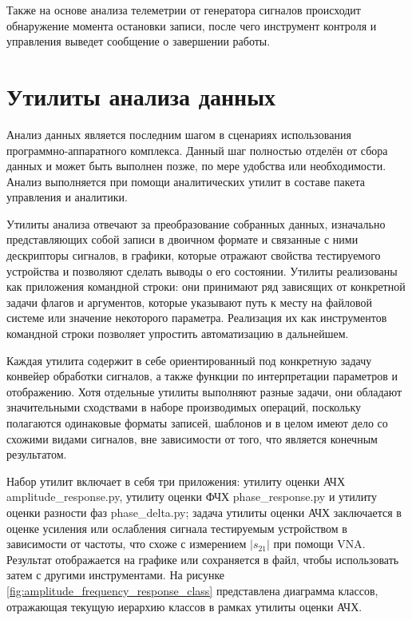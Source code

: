 \documentclass{report}
\begin{document}
Также на основе анализа телеметрии от генератора сигналов происходит обнаружение момента остановки записи, после чего инструмент контроля и управления выведет сообщение о завершении работы.

\section{Утилиты анализа данных}

Анализ данных является последним шагом в сценариях использования программно-аппаратного комплекса. Данный шаг полностью отделён от сбора данных и может быть выполнен позже, по мере удобства или необходимости. Анализ выполняется при помощи аналитических утилит в составе пакета управления и аналитики.

Утилиты анализа отвечают за преобразование собранных данных, изначально представляющих собой записи в двоичном формате и связанные с ними дескрипторы сигналов, в графики, которые отражают свойства тестируемого устройства и позволяют сделать выводы о его состоянии. Утилиты реализованы как приложения командной строки: они принимают ряд зависящих от конкретной задачи флагов и аргументов, которые указывают путь к месту на файловой системе или значение некоторого параметра. Реализация их как инструментов командной строки позволяет упростить автоматизацию в дальнейшем.

Каждая утилита содержит в себе ориентированный под конкретную задачу конвейер обработки сигналов, а также функции по интерпретации параметров и отображению. Хотя отдельные утилиты выполняют разные задачи, они обладают значительными сходствами в наборе производимых операций, поскольку полагаются одинаковые форматы записей, шаблонов и в целом имеют дело со схожими видами сигналов, вне зависимости от того, что является конечным результатом.

Набор утилит включает в себя три приложения: утилиту оценки АЧХ amplitude\_response.py, утилиту оценки ФЧХ phase\_response.py и утилиту оценки разности фаз phase\_delta.py; задача утилиты оценки АЧХ заключается в оценке усиления или ослабления сигнала тестируемым устройством в зависимости от частоты, что схоже с измерением $|s_{21}|$ при помощи VNA. Результат отображается на графике или сохраняется в файл, чтобы использовать затем с другими инструментами. На рисунке \ref{fig:amplitude_frequency_response_class} представлена диаграмма классов, отражающая текущую иерархию классов в рамках утилиты оценки АЧХ.

\end{document}
